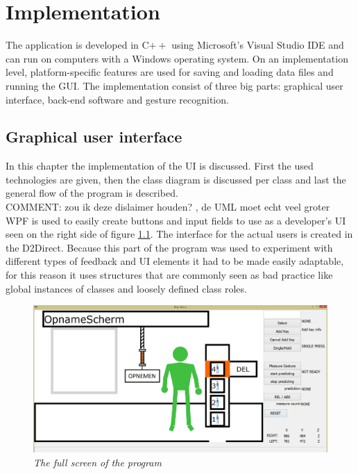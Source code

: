 \chapter{Implementation}

The application is developed in C$++$ using Microsoft's Visual Studio IDE and can run on computers with a Windows operating system. On an implementation level, platform-specific features are used for saving and loading data files and running the GUI. The implementation consist of three big parts: graphical user interface, back-end software and gesture recognition.\\


\section{Graphical user interface}



In this chapter the implementation of the UI is discussed. First the used technologies are given, then the class diagram is discussed per class and last the general flow of the program is described.\\

{\large COMMENT: zou ik deze dislaimer houden? , de UML moet echt veel groter} \\

WPF is used to easily create buttons and input fields to use as a developer's UI seen on the right side of figure \ref{real implementation}. The interface for the actual users is created in the D2Direct. Because this part of the program was used to experiment with different types of feedback and UI elements it had to be made easily adaptable, for this reason it uses structures that are commonly seen as bad practice like global instances of classes and loosely defined class roles.  

\begin{figure}[H]
	\begin{center}
		\includegraphics[width=14cm]{figures/1_full_screen_with_user.png}
		\caption{\emph{The full screen of the program}}
		\label{real implementation}
	\end{center}
\end{figure}

